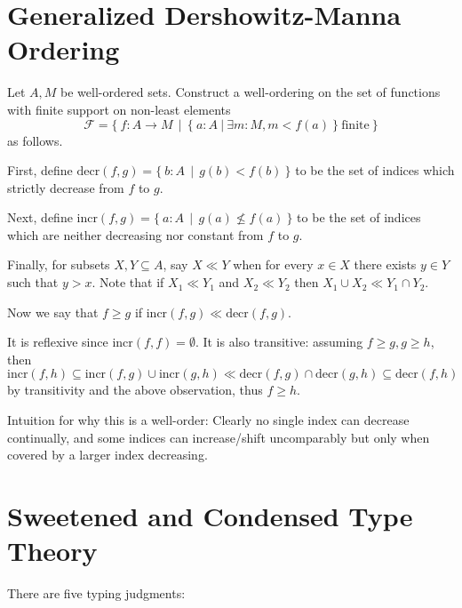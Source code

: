 \documentclass[11pt, twoside, reqno]{book}
\begin{document}
\renewcommand{\contentsname}{Contents}
\fancyhead[LE]{\textit{\nouppercase{\leftmark}}}
\fancyhead[RO]{\textit{\nouppercase{\rightmark}}}

\section{Generalized Dershowitz-Manna Ordering}
Let $A, M$ be well-ordered sets. Construct a well-ordering on the set of functions with finite support on non-least elements
$$\mathcal{F} = \{\ f : A \to M\ \ |\ \ \{\ a : A\ |\ \exists m : M, m < f(a)\ \}\ \text{finite}\ \}$$ as follows.

First, define $\text{decr}(f, g) = \{\ b : A\ \ |\ \ g(b) < f(b)\ \}$ to be the set of indices which strictly decrease from $f$ to $g$.

Next, define $\text{incr}(f, g) = \{\ a : A\ \ |\ \ g(a) \nleq f(a)\ \}$ to be the set of indices which are neither decreasing nor constant from $f$ to $g$.

Finally, for subsets $X, Y \subseteq A$, say $X \ll Y$ when for every $x \in X$ there exists $y \in Y$ such that $y > x$. Note that if $X_1 \ll Y_1$ and $X_2 \ll Y_2$ then $X_1 \cup X_2 \ll Y_1 \cap Y_2$.

Now we say that $f \ge g$ if $\text{incr}(f, g) \ll \text{decr}(f, g)$.

It is reflexive since $\text{incr}(f, f) = \emptyset$. It is also transitive: assuming $f \ge g, g \ge h$, then $\text{incr}(f, h) \subseteq \text{incr}(f, g) \cup \text{incr}(g, h) \ll \text{decr}(f, g) \cap \text{decr}(g, h) \subseteq \text{decr}(f, h)$ by transitivity and the above observation, thus $f \ge h$.

Intuition for why this is a well-order: Clearly no single index can decrease continually, and some indices can increase/shift uncomparably but only when covered by a larger index decreasing.

\section{Sweetened and Condensed Type Theory}

There are five typing judgments:
\end{document}
